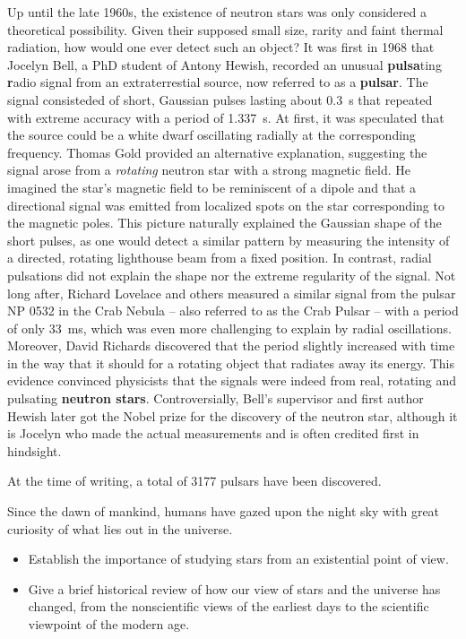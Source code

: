 Up until the late 1960s, the existence of neutron stars was only considered a theoretical possibility.
Given their supposed small size, rarity and faint thermal radiation, how would one ever detect such an object?
It was first in 1968 that Jocelyn Bell, a PhD student of Antony Hewish, recorded an unusual \textbf{pulsa}ting \textbf{r}adio signal from an extraterrestial source, now referred to as a \textbf{pulsar}. \cite{ref:neutron_star_discovery_first}
The signal consisteded of short, Gaussian pulses lasting about \SI{0.3}{\second} that repeated with extreme accuracy with a period of \SI{1.337}{\second}. 
At first, it was speculated that the source could be a white dwarf oscillating radially at the corresponding frequency.
Thomas Gold provided an alternative explanation, suggesting the signal arose from a \emph{rotating} neutron star with a strong magnetic field. \cite{ref:neutron_star_gold}
He imagined the star's magnetic field to be reminiscent of a dipole and that a directional signal was emitted from localized spots on the star corresponding to the magnetic poles.
This picture naturally explained the Gaussian shape of the short pulses, as one would detect a similar pattern by measuring the intensity of a directed, rotating lighthouse beam from a fixed position.
In contrast, radial pulsations did not explain the shape nor the extreme regularity of the signal.
Not long after, Richard Lovelace and others measured a similar signal from the pulsar NP 0532 in the Crab Nebula -- also referred to as the Crab Pulsar -- with a period of only \SI{33}{\milli\second}, which was even more challenging to explain by radial oscillations. \cite{ref:crab_pulsar_period_discovery}
Moreover, David Richards discovered that the period slightly increased with time in the way that it should for a rotating object that radiates away its energy.
This evidence convinced physicists that the signals were indeed from real, rotating and pulsating \textbf{neutron stars}.
Controversially, Bell's supervisor and first author Hewish later got the Nobel prize for the discovery of the neutron star, although it is Jocelyn who made the actual measurements and is often credited first in hindsight.

At the time of writing, a total of 3177 pulsars have been discovered. \cite{ref:pulsar_catalogue}


Since the dawn of mankind, humans have gazed upon the night sky with great curiosity of what lies out in the universe.
\begin{itemize}
\item Establish the importance of studying stars from an existential point of view.
\item Give a brief historical review of how our view of stars and the universe has changed, from the nonscientific views of the earliest days to the scientific viewpoint of the modern age.
\end{itemize}

